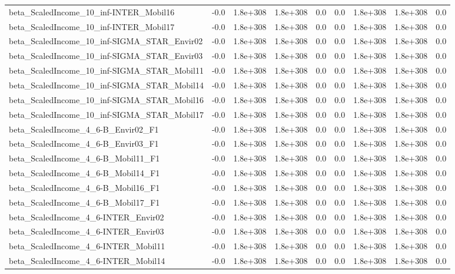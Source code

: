 \begin{tabular}{lrrrrrrrr}
beta_ScaledIncome_10_inf-INTER_Mobil16 & -0.0 & 1.8e+308 & 1.8e+308 & 0.0 & 0.0 & 1.8e+308 & 1.8e+308 & 0.0 \\
beta_ScaledIncome_10_inf-INTER_Mobil17 & -0.0 & 1.8e+308 & 1.8e+308 & 0.0 & 0.0 & 1.8e+308 & 1.8e+308 & 0.0 \\
beta_ScaledIncome_10_inf-SIGMA_STAR_Envir02 & -0.0 & 1.8e+308 & 1.8e+308 & 0.0 & 0.0 & 1.8e+308 & 1.8e+308 & 0.0 \\
beta_ScaledIncome_10_inf-SIGMA_STAR_Envir03 & -0.0 & 1.8e+308 & 1.8e+308 & 0.0 & 0.0 & 1.8e+308 & 1.8e+308 & 0.0 \\
beta_ScaledIncome_10_inf-SIGMA_STAR_Mobil11 & -0.0 & 1.8e+308 & 1.8e+308 & 0.0 & 0.0 & 1.8e+308 & 1.8e+308 & 0.0 \\
beta_ScaledIncome_10_inf-SIGMA_STAR_Mobil14 & -0.0 & 1.8e+308 & 1.8e+308 & 0.0 & 0.0 & 1.8e+308 & 1.8e+308 & 0.0 \\
beta_ScaledIncome_10_inf-SIGMA_STAR_Mobil16 & -0.0 & 1.8e+308 & 1.8e+308 & 0.0 & 0.0 & 1.8e+308 & 1.8e+308 & 0.0 \\
beta_ScaledIncome_10_inf-SIGMA_STAR_Mobil17 & -0.0 & 1.8e+308 & 1.8e+308 & 0.0 & 0.0 & 1.8e+308 & 1.8e+308 & 0.0 \\
beta_ScaledIncome_4_6-B_Envir02_F1 & -0.0 & 1.8e+308 & 1.8e+308 & 0.0 & 0.0 & 1.8e+308 & 1.8e+308 & 0.0 \\
beta_ScaledIncome_4_6-B_Envir03_F1 & -0.0 & 1.8e+308 & 1.8e+308 & 0.0 & 0.0 & 1.8e+308 & 1.8e+308 & 0.0 \\
beta_ScaledIncome_4_6-B_Mobil11_F1 & -0.0 & 1.8e+308 & 1.8e+308 & 0.0 & 0.0 & 1.8e+308 & 1.8e+308 & 0.0 \\
beta_ScaledIncome_4_6-B_Mobil14_F1 & -0.0 & 1.8e+308 & 1.8e+308 & 0.0 & 0.0 & 1.8e+308 & 1.8e+308 & 0.0 \\
beta_ScaledIncome_4_6-B_Mobil16_F1 & -0.0 & 1.8e+308 & 1.8e+308 & 0.0 & 0.0 & 1.8e+308 & 1.8e+308 & 0.0 \\
beta_ScaledIncome_4_6-B_Mobil17_F1 & -0.0 & 1.8e+308 & 1.8e+308 & 0.0 & 0.0 & 1.8e+308 & 1.8e+308 & 0.0 \\
beta_ScaledIncome_4_6-INTER_Envir02 & -0.0 & 1.8e+308 & 1.8e+308 & 0.0 & 0.0 & 1.8e+308 & 1.8e+308 & 0.0 \\
beta_ScaledIncome_4_6-INTER_Envir03 & -0.0 & 1.8e+308 & 1.8e+308 & 0.0 & 0.0 & 1.8e+308 & 1.8e+308 & 0.0 \\
beta_ScaledIncome_4_6-INTER_Mobil11 & -0.0 & 1.8e+308 & 1.8e+308 & 0.0 & 0.0 & 1.8e+308 & 1.8e+308 & 0.0 \\
beta_ScaledIncome_4_6-INTER_Mobil14 & -0.0 & 1.8e+308 & 1.8e+308 & 0.0 & 0.0 & 1.8e+308 & 1.8e+308 & 0.0 \\

\end{tabular}
